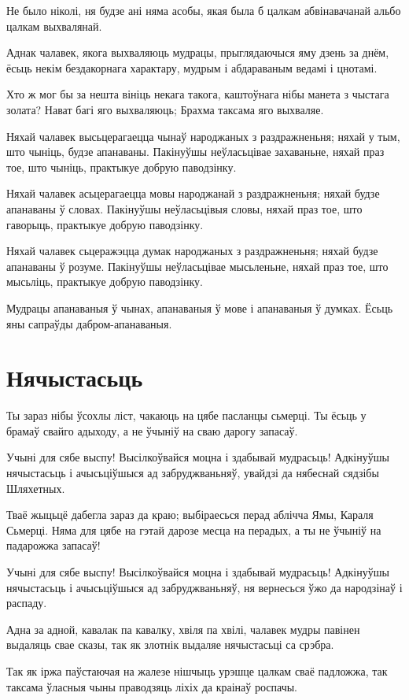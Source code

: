\documentclass{article}
\begin{document}
Не было ніколі, ня будзе ані няма асобы, якая была б цалкам
абвінавачанай альбо цалкам выхвалянай.

Аднак чалавек, якога выхваляюць мудрацы, прыглядаючыся яму дзень за
днём, ёсьць некім бездакорнага характару, мудрым і абдараваным ведамі і
цнотамі.

Хто ж мог бы за нешта вініць некага такога, каштоўнага нібы манета
з чыстага золата? Нават багі яго выхваляюць; Брахма таксама яго
выхваляе.

Няхай чалавек высьцерагаецца чынаў народжаных з раздражненьня;
няхай у тым, што чыніць, будзе апанаваны. Пакінуўшы неўласьцівае
захаваньне, няхай праз тое, што чыніць, практыкуе добрую паводзінку.

Няхай чалавек асьцерагаецца мовы народжанай з раздражненьня; няхай
будзе апанаваны ў словах. Пакінуўшы неўласьцівыя словы, няхай праз тое,
што гаворыць, практыкуе добрую паводзінку.

Няхай чалавек сьцеражэцца думак народжаных з раздражненьня; няхай
будзе апанаваны ў розуме. Пакінуўшы неўласьцівае мысьленьне, няхай праз
тое, што мысьліць, практыкуе добрую паводзінку.

Мудрацы апанаваныя ў чынах, апанаваныя ў мове і апанаваныя ў
думках. Ёсьць яны сапраўды дабром-апанаваныя.

\section{Нячыстасьць}

Ты зараз нібы ўсохлы ліст, чакаюць на цябе пасланцы сьмерці. Ты
ёсьць у брамаў свайго адыходу, а не ўчыніў на сваю дарогу запасаў.

Учыні для сябе выспу! Высілкоўвайся моцна і здабывай мудрасьць!
Адкінуўшы нячыстасьць і ачысьціўшыся ад забруджваньняў, увайдзі да
нябеснай сядзібы Шляхетных.

Тваё жыцьцё дабегла зараз да краю; выбіраесься перад аблічча Ямы,
Караля Сьмерці. Няма для цябе на гэтай дарозе месца на перадых, а ты не
ўчыніў на падарожжа запасаў!

Учыні для сябе выспу! Высілкоўвайся моцна і здабывай мудрасьць!
Адкінуўшы нячыстасьць і ачысьціўшыся ад забруджваньняў, ня вернесься ўжо
да народзінаў і распаду.

Адна за адной, кавалак па кавалку, хвіля па хвілі, чалавек мудры
павінен выдаляць свае сказы, так як злотнік выдаляе нячыстасьці са
срэбра.

Так як іржа паўстаючая на жалезе нішчыць урэшце цалкам сваё
падложжа, так таксама ўласныя чыны праводзяць ліхіх да краінаў роспачы.
\end{document}
